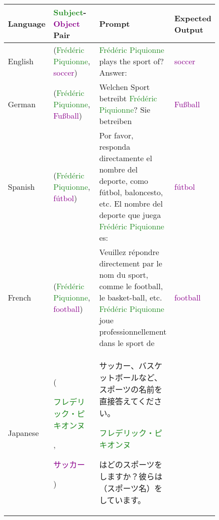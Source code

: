 \begin{table*}[htbp]
\scriptsize
\centering
\setlength{\tabcolsep}{1.0mm}{}
\begin{center}
\begin{tabular}{m{0.10\linewidth} p{0.30\linewidth} p{0.30\linewidth} m{0.15\linewidth}}
\textbf{Language} & \textbf{\textcolor{forestgreen}{Subject}-\textcolor{darkmagenta}{Object} Pair} & \textbf{Prompt} & \textbf{Expected Output} \\
\toprule
{\centering English} 
    & {\raggedright (\textcolor{forestgreen}{Frédéric Piquionne}, \textcolor{darkmagenta}{soccer})}
    & \textcolor{forestgreen}{Frédéric Piquionne} plays the sport of? \newline Answer:
    & {\centering \textcolor{darkmagenta}{soccer}} \\
\midrule
{\centering German} 
    & {\raggedright (\textcolor{forestgreen}{Frédéric Piquionne}, \textcolor{darkmagenta}{Fußball})}
    & Welchen Sport betreibt \textcolor{forestgreen}{Frédéric Piquionne}? Sie betreiben
    & {\centering \textcolor{darkmagenta}{Fußball}} \\
\midrule
{\centering Spanish} 
    & {\raggedright (\textcolor{forestgreen}{Frédéric Piquionne}, \textcolor{darkmagenta}{fútbol})}
    & Por favor, responda directamente el nombre del deporte, como fútbol, baloncesto, etc. El nombre del deporte que juega \textcolor{forestgreen}{Frédéric Piquionne} es:
    & {\centering \textcolor{darkmagenta}{fútbol}} \\
\midrule
{\centering French} 
    & {\raggedright (\textcolor{forestgreen}{Frédéric Piquionne}, \textcolor{darkmagenta}{football})}
    & Veuillez répondre directement par le nom du sport, comme le football, le basket-ball, etc. \textcolor{forestgreen}{Frédéric Piquionne} joue professionnellement dans le sport de
    & {\centering \textcolor{darkmagenta}{football}} \\
\midrule
{\centering Japanese} 
    & {\raggedright (\textcolor{forestgreen}{\begin{CJK}{UTF8}{min}フレデリック・ピキオンヌ\end{CJK}}, \textcolor{darkmagenta}{\begin{CJK}{UTF8}{min}サッカー\end{CJK}})}
    & \begin{CJK}{UTF8}{min}サッカー、バスケットボールなど、スポーツの名前を直接答えてください。\end{CJK}\textcolor{forestgreen}{\begin{CJK}{UTF8}{min}フレデリック・ピキオンヌ\end{CJK}}\begin{CJK}{UTF8}{min}はどのスポーツをしますか？彼らは（スポーツ名）をしています。\end{CJK}

\end{tabular}
\end{center}
\end{table*}
